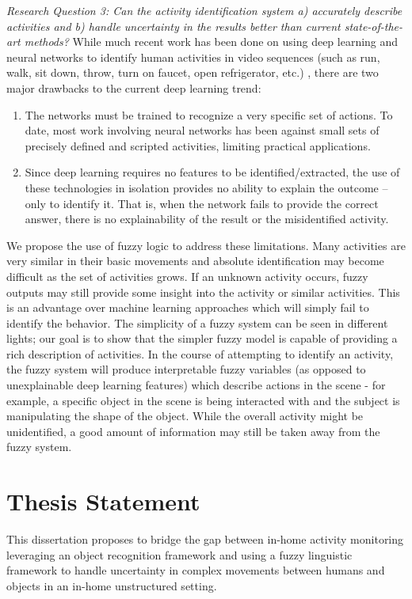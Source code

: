 \documentclass[12pt]{report}
\begin{document}
\emph{Research Question 3: Can the activity identification system a) accurately describe activities and b) handle uncertainty in the results better than current state-of-the-art methods?}
While much recent work has been done on using deep learning and neural networks to identify human activities in video sequences (such as run, walk, sit down, throw, turn on faucet, open refrigerator, etc.) \cite{Abebe2016, Ozkan2017, Li2016}, there are two major drawbacks to the current deep learning trend:
\begin{enumerate}
    \item The networks must be trained to recognize a very specific set of actions. To date, most work involving neural networks has been against small sets of precisely defined and scripted activities, limiting practical applications.
    \item Since deep learning requires no features to be identified/extracted, the use of these technologies in isolation provides no ability to explain the outcome – only to identify it. That is, when the network fails to provide the correct answer, there is no explainability of the result or the misidentified activity.
\end{enumerate}

We propose the use of fuzzy logic to address these limitations. Many activities are very similar in their basic movements and absolute identification may become difficult as the set of activities grows. If an unknown activity occurs, fuzzy outputs may still provide some insight into the activity or similar activities. This is an advantage over machine learning approaches which will simply fail to identify the behavior. The simplicity of a fuzzy system can be seen in different lights; our goal is to show that the simpler fuzzy model is capable of providing a rich description of activities. In the course of attempting to identify an activity, the fuzzy system will produce interpretable fuzzy variables (as opposed to unexplainable deep learning features) which describe actions in the scene  - for example, a specific object in the scene is being interacted with and the subject is manipulating the shape of the object. While the overall activity might be unidentified, a good amount of information may still be taken away from the fuzzy system.


\section{Thesis Statement}
This dissertation proposes to bridge the gap between in-home activity monitoring leveraging an object recognition framework and using a fuzzy linguistic framework to handle uncertainty in complex movements between humans and objects in an in-home unstructured setting.
\end{document}
